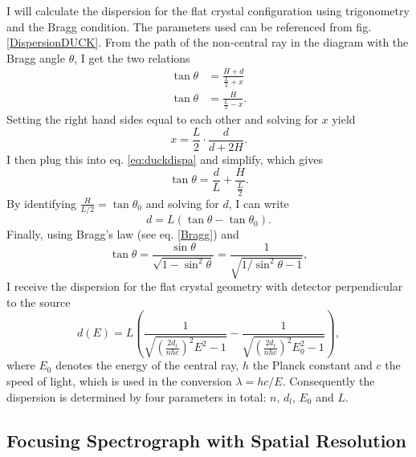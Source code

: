 I will calculate the dispersion for the flat crystal configuration using 
trigonometry and the Bragg condition. The parameters used can be referenced 
from fig. \ref{DispersionDUCK}. From the path of the non-central ray in the 
diagram with the Bragg angle $\theta$, I get the two relations
\begin{subequations}
	\begin{align}
		\tan\theta &= \frac{H+d}{\frac{L}{2} + x} \label{eq:duckdispa} \\
		\tan\theta &= \frac{H}{\frac{L}{2}-x}. \label{eq:duckdispb}
	\end{align}
\end{subequations} 
Setting the right hand sides equal to each other and solving for $x$ yield
\begin{equation}
	x = \frac{L}{2}\cdot\frac{d}{d + 2H}.
\end{equation}
I then plug this into eq. \ref{eq:duckdispa} and simplify, 
which gives
\begin{equation}
\tan\theta = \frac{d}{L} + \frac{H}{\frac{L}{2}}.
\end{equation}
By identifying $\frac{H}{L/2} = \tan\theta_0$ and solving for $d$, I can write
\begin{equation}
d = L(\tan\theta-\tan\theta_0).
\end{equation}
Finally, using Bragg's law (see eq. \ref{Bragg}) and 
\begin{equation}
	\tan\theta = \frac{\sin\theta}{\sqrt{1-\sin^2\theta}} = 
	\frac{1}{\sqrt{1/\sin^2\theta - 1}},
\end{equation}
I receive the dispersion for the flat crystal geometry with detector 
perpendicular to the source
\begin{equation}
d(E) = L\left(\frac{1}{\sqrt{\left(\frac{2d_l}{nhc}\right)^2E^2 - 1}}  - 
\frac{1}{\sqrt{\left(\frac{2d_l}{nhc}\right)^2E_0^2 - 1}}\right),
\label{DispersionCalcDUCK}
\end{equation}
where $E_0$ denotes the energy of the central ray, $h$ the Planck constant and 
$c$ the speed of 
light, which is used in the conversion $\lambda = hc/E$. 
Consequently the dispersion is determined by four parameters in total: $n$, 
$d_l$, $E_0$ and $L$.

\subsection{Focusing Spectrograph with Spatial Resolution}


